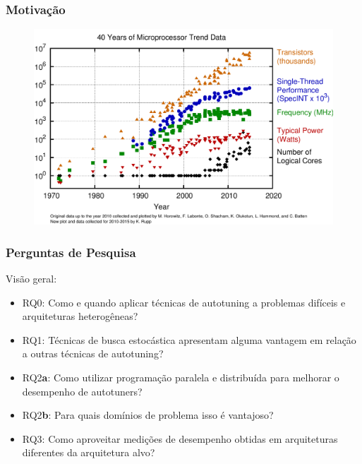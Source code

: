 \documentclass[10pt, compress]{beamer}
\begin{document}
\begin{frame}[fragile]
    \frametitle{Motivação}
    \begin{figure}[H]
        \centering
        \includegraphics[width=1\textwidth]{40years}
    \end{figure}%
    \let\thefootnote\relax{}
\end{frame}

\begin{frame}[fragile]
    \frametitle{Perguntas de Pesquisa}
    Visão geral:
    \begin{itemize}
        \item \alert{RQ0}: Como e quando aplicar técnicas de
            autotuning a problemas difíceis e arquiteturas heterogêneas?
        \item \alert{RQ1}: Técnicas de busca estocástica apresentam
            alguma vantagem em relação a outras técnicas de autotuning?
        \item \alert{RQ2\textbf{a}}: Como utilizar programação paralela e
            distribuída para melhorar o desempenho de autotuners?
        \item \alert{RQ2\textbf{b}}: Para quais domínios de problema isso é
            vantajoso?
        \item \alert{RQ3}: Como aproveitar medições de desempenho obtidas
            em arquiteturas diferentes da arquitetura alvo?
    \end{itemize}
\end{frame}
\end{document}
